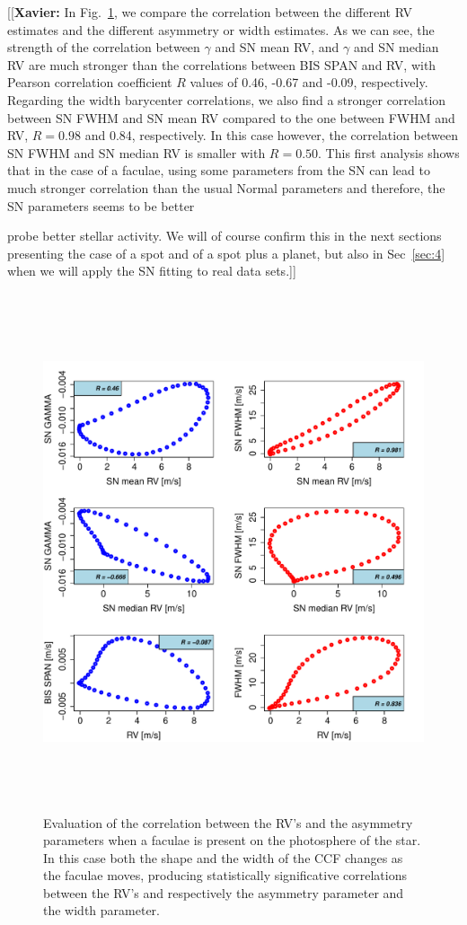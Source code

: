 \documentclass{aa}
\newcommand{\xavier}[1]{{\color{blue}[[\textbf{Xavier: }#1]]}}
\begin{document}
\xavier{In Fig.~\ref{fig:faculae.corr}, we compare the correlation between the different RV estimates and the different asymmetry or width estimates. As we can see, the strength of the correlation between $\gamma$ and SN mean RV, and $\gamma$ and SN median RV are much stronger than the correlations between BIS SPAN and RV, with Pearson correlation coefficient $R$ values of 0.46, -0.67 and -0.09, respectively. Regarding the width barycenter correlations, we also find a stronger correlation between SN FWHM and SN mean RV compared to the one between FWHM and RV, $R=0.98$ and 0.84, respectively. In this case however, the correlation between SN FWHM and SN median RV is smaller with $R=0.50$. This first analysis shows that in the case of a faculae, using some parameters from the SN can lead to much stronger correlation than the usual Normal parameters and therefore, the SN parameters seems to be better 

probe better stellar activity. We will of course confirm this in the next sections presenting the case of a spot and of a spot plus a planet, but also in Sec~\ref{sec:4} when we will apply the SN fitting to real data sets.}

\begin{figure}[htbp]
   \centering
\includegraphics[height = 6in]{SOAP_FACULAE_Comparison_para_SN.pdf} 
   \caption{Evaluation of the correlation between the RV's and the asymmetry parameters when a faculae is present on the photosphere of the star. In this case both the shape and the width of the CCF changes as the faculae moves, producing statistically significative correlations between the RV's and respectively the asymmetry parameter and the width parameter.}
    \label{fig:faculae.corr}
\end{figure}
\end{document}
